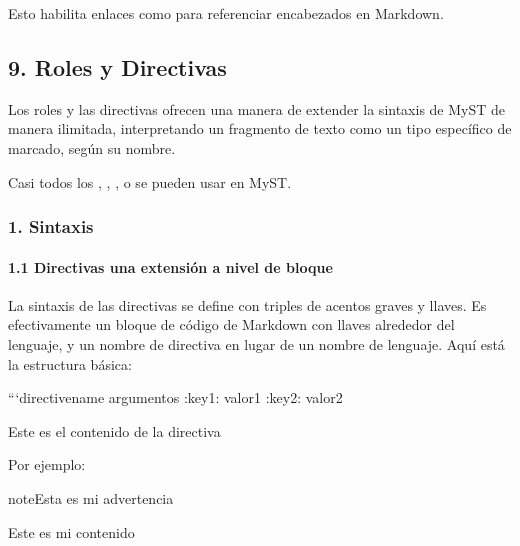 \documentclass[a4paper,10pt,oneside,spanish,openany]{sphinxmanual}
\begin{document}
\sphinxAtStartPar
Esto habilita enlaces como  para referenciar encabezados en Markdown.


\subsection{9. Roles y Directivas}
\label{\detokenize{configuracion_inicial/013.guia_de_myst_parser:roles-y-directivas}}
\sphinxAtStartPar
Los roles y las directivas ofrecen una manera de extender la sintaxis de MyST de manera ilimitada,
interpretando un fragmento de texto como un tipo específico de marcado, según su nombre.

\sphinxAtStartPar
Casi todos los ,
,
, o 
se pueden usar en MyST.


\subsubsection{1. Sintaxis}
\label{\detokenize{configuracion_inicial/013.guia_de_myst_parser:sintaxis}}

\paragraph{1.1 Directivas \sphinxhyphen{} una extensión a nivel de bloque}
\label{\detokenize{configuracion_inicial/013.guia_de_myst_parser:directivas-una-extension-a-nivel-de-bloque}}
\sphinxAtStartPar
La sintaxis de las directivas se define con triples de acentos graves y llaves.
Es efectivamente un bloque de código de Markdown con llaves alrededor del lenguaje, y un nombre de directiva en lugar de un nombre de lenguaje.
Aquí está la estructura básica:

\begin{sphinxVerbatim}[commandchars=\\\{\}]
```\PYGZob{}directivename\PYGZcb{} argumentos
:key1: valor1
:key2: valor2

Este es el contenido de la directiva
\end{sphinxVerbatim}

\sphinxAtStartPar
Por ejemplo:

\begin{sphinxadmonition}{note}{Esta es mi advertencia}

\sphinxAtStartPar
Este es mi contenido
\end{sphinxadmonition}
\end{document}
